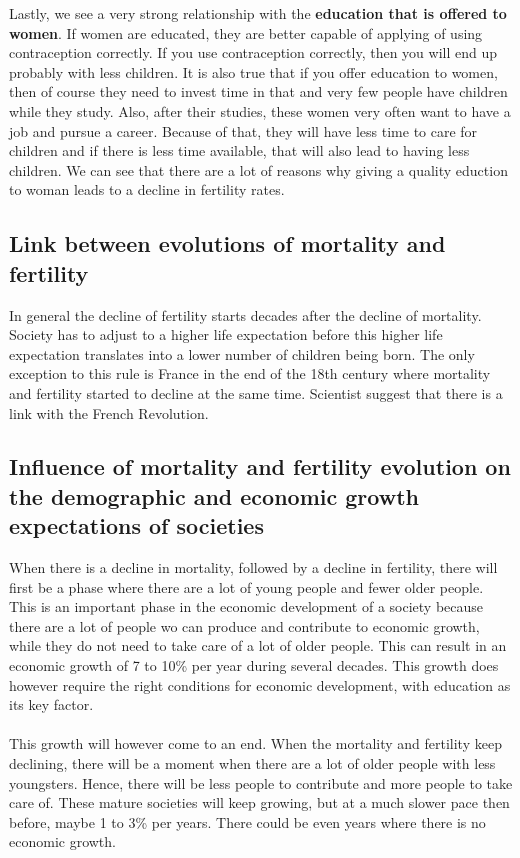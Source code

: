 \documentclass[../summary.tex]{subfiles}
\begin{document}
	Lastly, we see a very strong relationship with the \textbf{education that is offered to women}. If women are educated, they are better capable of applying of using contraception correctly. If you use contraception correctly, then you will end up probably with less children. It is also true that if you offer education to women, then of course they need to invest time in that and very few people have children while they study. Also, after their studies, these women very often want to have a job and pursue a career. Because of that, they will have less time to care for children and if there is less time available, that will also lead to having less children. We can see that there are a lot of reasons why giving a quality eduction to woman leads to a decline in fertility rates.
	
	\subsection{Link between evolutions of mortality and fertility}
	In general the decline of fertility starts decades after the decline of mortality. Society has to adjust to a higher life expectation before this higher life expectation translates into a lower number of children being born. The only exception to this rule is France in the end of the 18th century where mortality and fertility started to decline at the same time. Scientist suggest that there is a link with the French Revolution. 
	
	\subsection{Influence of mortality and fertility evolution on the demographic and economic growth expectations of societies}
	When there is a decline in mortality, followed by a decline in fertility, there will first be a phase where there are a lot of young people and fewer older people. This is an important phase in the economic development of a society because there are a lot of people wo can produce and contribute to economic growth, while they do not need to take care of a lot of older people. This can result in an economic growth of 7 to 10\% per year during several decades. This growth does however require the right conditions for economic development, with education as its key factor.
	\\
	\\
	This growth will however come to an end. When the mortality and fertility keep declining, there will be a moment when there are a lot of older people with less youngsters. Hence, there will be less people to contribute and more people to take care of. These mature societies will keep growing, but at a much slower pace then before, maybe 1 to 3\% per years. There could be even years where there is no economic growth.
	
\end{document}
